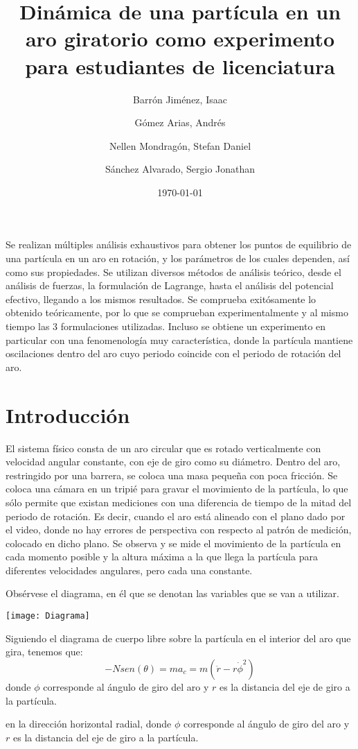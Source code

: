 \documentclass[12p]{article}
\title{Dinámica de una partícula en un aro giratorio como experimento para estudiantes de licenciatura}
\author
{Barr\'on Jim\'enez, Isaac
	\and
	G\'omez Arias, Andr\'es
	\and
	Nellen Mondrag\'on, Stefan Daniel
	\and
	S\'anchez Alvarado, Sergio Jonathan	
	}
\date{\today}
\begin{document}
\maketitle

\abstract 
{Se realizan múltiples análisis exhaustivos para obtener los puntos de equilibrio de una partícula en un aro en rotación, y los parámetros de los cuales dependen, así como sus propiedades. Se utilizan diversos métodos de análisis teórico, desde el análisis de fuerzas, la formulación de Lagrange, hasta el análisis del potencial efectivo, llegando a los mismos resultados. Se comprueba exitósamente lo obtenido teóricamente, por lo que se comprueban experimentalmente y al mismo tiempo las 3 formulaciones utilizadas. Incluso se obtiene un experimento en particular con una fenomenología muy característica, donde la partícula mantiene oscilaciones dentro del aro cuyo periodo coincide con el periodo de rotación del aro. 
}
\newpage


\section{Introducción}
El sistema físico consta de un aro circular que es rotado verticalmente con velocidad angular constante, con eje de giro como su diámetro. Dentro del aro, restringido por una barrera, se coloca una masa pequeña con poca fricción. Se coloca una cámara en un tripié para gravar el movimiento de la partícula, lo que sólo permite que existan mediciones con una diferencia de tiempo de la mitad del periodo de rotación. Es decir, cuando el aro está alineado con el plano dado por el video, donde no hay errores de perspectiva con respecto al patrón de medición, colocado en dicho plano.
Se observa y se mide el movimiento de la partícula en cada momento posible y la altura máxima a la que llega la partícula para diferentes velocidades angulares, pero cada una constante.

Obsérvese el diagrama, en él que se denotan las variables que se van a utilizar.

\texttt{[image: Diagrama]}

Siguiendo el diagrama de cuerpo libre sobre la partícula en el interior del aro que gira, tenemos que:
$$-Nsen(\theta)=ma_{c}=m(\ddot{r}-r\dot{\phi}^2)$$
donde $\phi$ corresponde al ángulo de giro del aro y $r$ es la distancia del eje de giro a la partícula.

en la dirección horizontal radial, donde $\phi$ corresponde al ángulo de giro del aro y $r$ es la distancia del eje de giro a la partícula.
\end{document}
